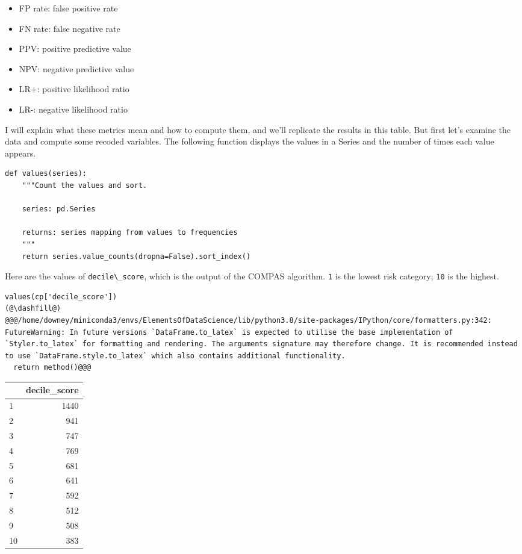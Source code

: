 \begin{itemize}

\item
  FP rate: false positive rate
\item
  FN rate: false negative rate
\item
  PPV: positive predictive value
\item
  NPV: negative predictive value
\item
  LR+: positive likelihood ratio
\item
  LR-: negative likelihood ratio
\end{itemize}

I will explain what these metrics mean and how to compute them, and
we'll replicate the results in this table. But first let's examine the
data and compute some recoded variables. The following function displays
the values in a Series and the number of times each value appears.

\begin{lstlisting}[]
def values(series):
    """Count the values and sort.
    
    series: pd.Series
    
    returns: series mapping from values to frequencies
    """
    return series.value_counts(dropna=False).sort_index()
\end{lstlisting}

Here are the values of \passthrough{\lstinline!decile\_score!}, which is
the output of the COMPAS algorithm. \passthrough{\lstinline!1!} is the
lowest risk category; \passthrough{\lstinline!10!} is the highest.

\begin{lstlisting}[]
values(cp['decile_score'])
(@\dashfill@)
@@@/home/downey/miniconda3/envs/ElementsOfDataScience/lib/python3.8/site-packages/IPython/core/formatters.py:342: FutureWarning: In future versions `DataFrame.to_latex` is expected to utilise the base implementation of `Styler.to_latex` for formatting and rendering. The arguments signature may therefore change. It is recommended instead to use `DataFrame.style.to_latex` which also contains additional functionality.
  return method()@@@
\end{lstlisting}

\begin{tabular}{lr}
\midrule
{} &  decile\_score \\
\midrule
1  &          1440 \\
2  &           941 \\
3  &           747 \\
4  &           769 \\
5  &           681 \\
6  &           641 \\
7  &           592 \\
8  &           512 \\
9  &           508 \\
10 &           383 \\
\midrule
\end{tabular}

